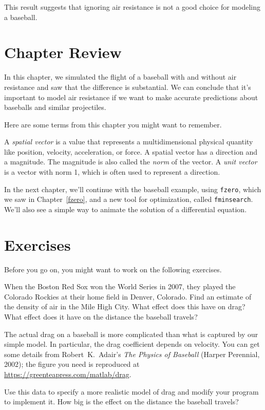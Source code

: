 This result suggests that ignoring air resistance is not a good choice for modeling a baseball.

\section{Chapter Review}

In this chapter, we simulated the flight of a baseball with and without air resistance and saw that the difference is substantial.
We can conclude that it's important to model air resistance if we want to make accurate predictions about baseballs and similar projectiles.

Here are some terms from this chapter you might want to remember.

A \emph{spatial vector} is a value that represents a multidimensional physical quantity like position, velocity, acceleration, or force.
A spatial vector has a direction and a magnitude.  The magnitude is also called the \emph{norm} of the vector.
A \emph{unit vector} is a vector with norm 1, which is often used to represent a
direction.

In the next chapter, we'll continue with the baseball example, using \lstinline{fzero}, which we saw in Chapter~\ref{fzero}, and a new tool for optimization, called \lstinline{fminsearch}.  We'll also see a simple way to animate the solution of a differential equation.


\section{Exercises}

Before you go on, you might want to work on the following exercises.

\begin{ex}


When the Boston Red Sox won the World Series in 2007, they played the
Colorado Rockies at their home field in Denver, Colorado.  Find an
estimate of the density of air in the Mile High City.  What effect
does this have on drag?  What effect does it have on the distance the baseball travels?
\end{ex}


\begin{ex}


The actual drag on a baseball is more complicated than what is
captured by our simple model.  In particular, the drag coefficient
depends on velocity.  You can get some details from Robert~K.\ Adair's \emph{The
Physics of Baseball} (Harper Perennial, 2002); the figure you need is reproduced at \url{https://greenteapress.com/matlab/drag}.

Use this data to specify a more realistic model of drag and modify your
program to implement it.  How big is the effect on the distance the baseball travels?
\end{ex}


